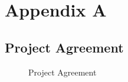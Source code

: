 \chapter{Appendix A}
\label{cha:Appendix A}



\section{Project Agreement}
\label{sec:Project Agreement}
\begin{figure}[H]
	\centering
	\caption{Project Agreement}
	\label{fig:Project Agreement}
\end{figure}
\newpage


